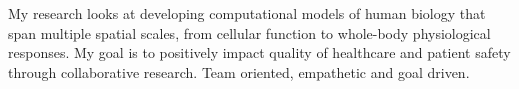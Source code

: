 %
%
%

\par{
	My research looks at developing computational models of human biology that span multiple spatial scales, from cellular function to whole-body physiological responses. My goal is to positively impact quality of healthcare and patient safety through collaborative research. Team oriented, empathetic and goal driven.
}